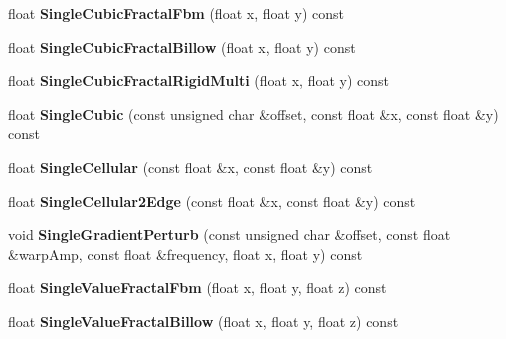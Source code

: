 \begin{DoxyCompactItemize}
\mbox{\label{class_flounder_1_1_noise_fast_aad93e6906b35c5f5cf9b591e40c21110}} 
float {\bfseries Single\+Cubic\+Fractal\+Fbm} (float x, float y) const
\item 
\mbox{\label{class_flounder_1_1_noise_fast_a9a5280a59ced3706b1b03a7c60d4b2d1}} 
float {\bfseries Single\+Cubic\+Fractal\+Billow} (float x, float y) const
\item 
\mbox{\label{class_flounder_1_1_noise_fast_a9846aae7881c352af01487346c37426d}} 
float {\bfseries Single\+Cubic\+Fractal\+Rigid\+Multi} (float x, float y) const
\item 
\mbox{\label{class_flounder_1_1_noise_fast_ab99ffcc039bc053d3c2ffa585610dc1e}} 
float {\bfseries Single\+Cubic} (const unsigned char \&offset, const float \&x, const float \&y) const
\item 
\mbox{\label{class_flounder_1_1_noise_fast_a801dcc021e6c3cf2b3dd4d142fcf5051}} 
float {\bfseries Single\+Cellular} (const float \&x, const float \&y) const
\item 
\mbox{\label{class_flounder_1_1_noise_fast_a73ed873984a1580ae32733aa259aaa0d}} 
float {\bfseries Single\+Cellular2\+Edge} (const float \&x, const float \&y) const
\item 
\mbox{\label{class_flounder_1_1_noise_fast_a0c3f40b62a86fd86db43550724c1885a}} 
void {\bfseries Single\+Gradient\+Perturb} (const unsigned char \&offset, const float \&warp\+Amp, const float \&frequency, float x, float y) const
\item 
\mbox{\label{class_flounder_1_1_noise_fast_a9476801494413efde9367836de48f607}} 
float {\bfseries Single\+Value\+Fractal\+Fbm} (float x, float y, float z) const
\item 
\mbox{\label{class_flounder_1_1_noise_fast_a61e76e0ff787698d2541bb699a910951}} 
float {\bfseries Single\+Value\+Fractal\+Billow} (float x, float y, float z) const
\item 

\end{DoxyCompactItemize}
